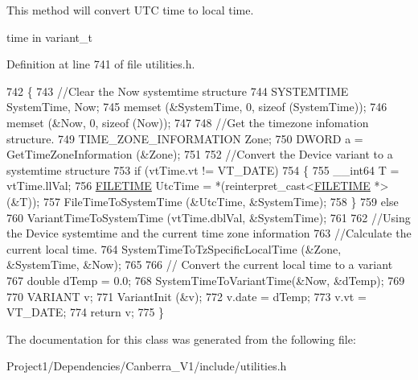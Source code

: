 This method will convert U\+TC time to local time.

time in variant\+\_\+t 

Definition at line 741 of file utilities.\+h.


\begin{DoxyCode}
742     \{
743         \textcolor{comment}{//Clear the Now systemtime structure}
744         SYSTEMTIME SystemTime, Now;
745         memset (&SystemTime, 0, \textcolor{keyword}{sizeof} (SystemTime));
746         memset (&Now, 0, \textcolor{keyword}{sizeof} (Now));
747 
748         \textcolor{comment}{//Get the timezone infomation structure.}
749         TIME\_ZONE\_INFORMATION Zone;
750         DWORD a = GetTimeZoneInformation (&Zone);
751 
752         \textcolor{comment}{//Convert the Device variant to a systemtime structure}
753         \textcolor{keywordflow}{if} (vtTime.vt != VT\_DATE)
754         \{
755             \_\_int64 T = vtTime.llVal;
756             \hyperlink{struct___f_i_l_e_t_i_m_e}{FILETIME} UtcTime = *(\textcolor{keyword}{reinterpret\_cast<}\hyperlink{struct___f_i_l_e_t_i_m_e}{FILETIME} *\textcolor{keyword}{>}(&T));
757             FileTimeToSystemTime (&UtcTime, &SystemTime);
758         \}
759         \textcolor{keywordflow}{else}
760             VariantTimeToSystemTime (vtTime.dblVal, &SystemTime);
761 
762         \textcolor{comment}{//Using the Device systemtime and the current time zone information}
763         \textcolor{comment}{//Calculate the current local time.}
764         SystemTimeToTzSpecificLocalTime (&Zone, &SystemTime, &Now);
765 
766         \textcolor{comment}{// Convert the current local time to a variant}
767         \textcolor{keywordtype}{double} dTemp = 0.0;
768         SystemTimeToVariantTime(&Now, &dTemp);
769 
770         VARIANT v;
771         VariantInit (&v);
772         v.date = dTemp;
773         v.vt = VT\_DATE;
774         \textcolor{keywordflow}{return} v;
775     \}
\end{DoxyCode}


The documentation for this class was generated from the following file\+:\begin{DoxyCompactItemize}
\item 
Project1/\+Dependencies/\+Canberra\+\_\+\+V1/include/utilities.\+h\end{DoxyCompactItemize}

